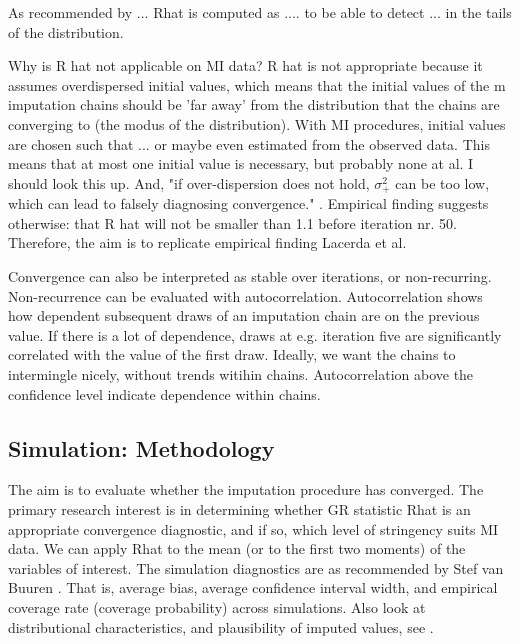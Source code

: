 \documentclass[article]{jss}
\begin{document}
As recommended by ... Rhat is computed as .... to be able to detect ... in the tails of the distribution.

Why is R hat not applicable on MI data? R hat is not appropriate because it assumes overdispersed initial values, which means that the initial values of the m imputation chains should be 'far away' from the distribution that the chains are converging to (the modus of the distribution). With MI procedures, initial values are chosen such that ... or maybe even estimated from the observed data. This means that at most one initial value is necessary, but probably none at al. I should look this up. And, "if over-dispersion does not hold, $\sigma_+^2$ can be too low, which can lead to falsely diagnosing convergence." \cite[p~437]{broo98}. Empirical finding suggests otherwise: that R hat will not be smaller than 1.1 before iteration nr. 50. Therefore, the aim is to replicate empirical finding Lacerda et al. 

Convergence can also be interpreted as stable over iterations, or non-recurring. Non-recurrence can be evaluated with autocorrelation. Autocorrelation shows how dependent subsequent draws of an imputation chain are on the previous value. If there is a lot of dependence, draws at e.g. iteration five are significantly correlated with the value of the first draw. Ideally, we want the chains to intermingle nicely, without trends witihin chains. Autocorrelation above the confidence level indicate dependence within chains.

\subsection{Simulation: Methodology}

The aim is to evaluate whether the imputation procedure has converged. The primary research interest is in determining whether GR statistic Rhat is an appropriate convergence diagnostic, and if so, which level of stringency suits MI data. We can apply Rhat to the mean (or to the first two moments) of the variables of interest.  The simulation diagnostics are as recommended by Stef van Buuren \cite{buur18}. That is, average bias, average confidence interval width, and empirical coverage rate (coverage probability) across simulations. Also look at distributional characteristics, and plausibility of imputed values, see \cite{vinknd}. %
\end{document}
